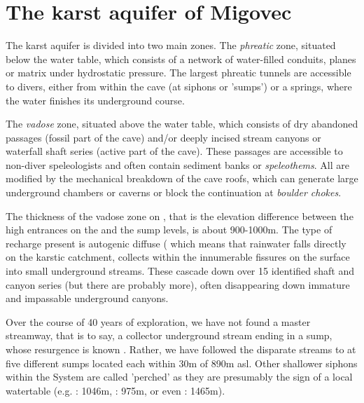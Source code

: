 \section{The karst aquifer of Migovec} 
The karst aquifer is divided into two main zones. The \emph{phreatic} zone, situated below the water table, which consists of a network of water-filled conduits, planes or matrix under hydrostatic pressure. The largest phreatic tunnels are accessible to divers, either from within the cave (at siphons or 'sumps') or a springs, where the water finishes its underground course. 
 
 The \emph{vadose} zone, situated above the water table, which consists of dry abandoned passages (fossil part of the cave) and/or deeply incised stream canyons or waterfall shaft series (active part of the cave). These passages are accessible to non-diver speleologists and often contain sediment banks or \emph{speleothems}. All are modified by the mechanical breakdown of the cave roofs, which can generate large underground chambers or caverns or block the continuation at \emph{boulder chokes}. 


The thickness of the vadose zone on , that is the elevation difference between the high entrances on the  and the sump levels, is about 900-1000m. The type of recharge present is autogenic diffuse (\citep{ford2013karst} which means that rainwater falls directly on the karstic catchment, collects within the innumerable fissures on the surface into small underground streams. These cascade down over 15 identified shaft and canyon series (but there are probably more), often disappearing down immature and impassable underground canyons. 

Over the course of 40 years of exploration, we have not found a master streamway, that is to say, a collector underground stream ending in a sump, whose resurgence is known \citep{hm1}. Rather, we have followed the disparate streams to at five different sumps located each within 30m of 890m asl. Other shallower siphons within the System are called 'perched'  as they are presumably the sign of a local watertable (e.g. : 1046m, : 975m, or even : 1465m).

